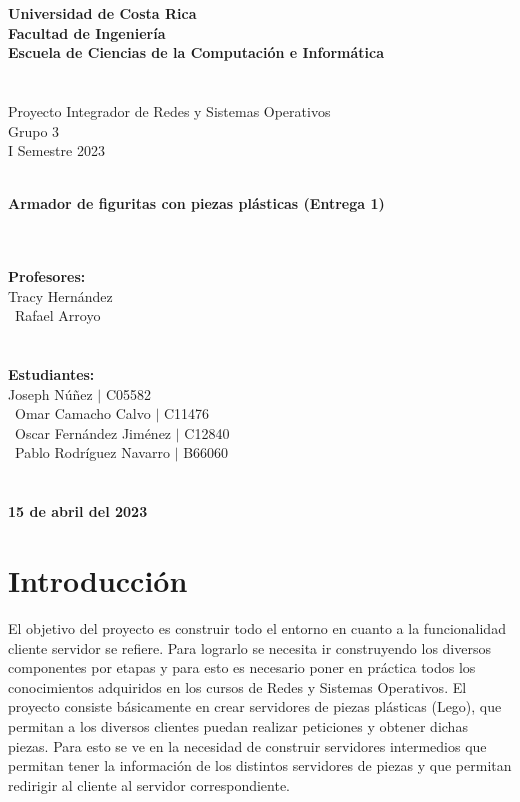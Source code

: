 \documentclass[a4paper,10pt]{article}
\begin{document}
	
\begin{center}
	\LARGE\textbf{Universidad de Costa Rica}\\
	\textbf{Facultad de Ingeniería}\\
	\textbf{Escuela de Ciencias de la Computación e Informática}\\ \ \\ \ \\
	\Large 	Proyecto Integrador de Redes y Sistemas Operativos\\
	Grupo 3\\
	I Semestre 2023\\ \ \\
\end{center}


\begin{center}
	\huge\textbf{Armador de figuritas con piezas plásticas (Entrega 1)} \\ \ \\ \
\end{center}

\begin{center}
	\LARGE\textbf{Profesores:}\\
	Tracy Hernández\\ \
	Rafael Arroyo\\ \ \\ \ \\
	\LARGE\textbf{Estudiantes:}\\
	Joseph Núñez $|$ C05582 \\ \  
	Omar Camacho Calvo $|$ C11476 \\ \ 
	Oscar Fernández Jiménez $|$ C12840 \\ \ 
	Pablo Rodríguez Navarro $|$ B66060 \\ \ \\ \ \\
	\LARGE\textbf{15 de abril del 2023}
\end{center}
	
	\thispagestyle{empty}
	\newpage
	
	\tableofcontents
	\setcounter{secnumdepth}{1}
	\newpage
	
	\section{Introducción}
	El objetivo del proyecto es construir todo el entorno en cuanto a la funcionalidad cliente servidor se refiere. Para lograrlo se necesita ir construyendo los diversos componentes por etapas y para esto es necesario poner en práctica todos los conocimientos adquiridos en los cursos de Redes y Sistemas Operativos.
	El proyecto consiste básicamente en crear servidores de piezas plásticas (Lego), que permitan a los diversos clientes puedan realizar peticiones y obtener dichas piezas. Para esto se ve en la necesidad de construir servidores intermedios que permitan tener la información de los distintos servidores de piezas y que permitan redirigir al cliente al servidor correspondiente.
	
\end{document}

